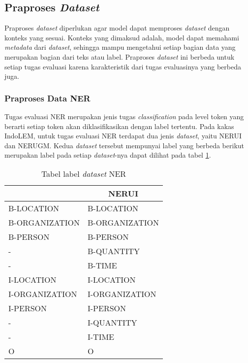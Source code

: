 \subsection{Praproses \textit{Dataset}}
\label{sec:praproses}

Praproses \textit{dataset} diperlukan agar model dapat memproses \textit{dataset} dengan konteks yang sesuai. Konteks yang dimaksud adalah, model dapat memahami \textit{metadata} dari \textit{dataset}, sehingga mampu mengetahui setiap bagian data yang merupakan bagian dari teks atau label. Praproses \textit{dataset} ini berbeda untuk setiap tugas evaluasi karena karakteristik dari tugas evaluasinya yang berbeda juga.

\subsubsection{Praproses Data NER}

Tugas evaluasi NER merupakan jenis tugas \textit{classification} pada level token yang berarti setiap token akan diklasifikasikan dengan label tertentu. Pada kakas IndoLEM, untuk tugas evaluasi NER terdapat dua jenis \textit{dataset}, yaitu NERUI dan NERUGM. Kedua \textit{dataset} tersebut mempunyai label yang berbeda berikut merupakan label pada setiap \textit{dataset}-nya dapat dilihat pada tabel \ref{table:label-ner}.

\begin{table}[h]
    \vspace{0.25cm}
    \caption{Tabel label \textit{dataset} NER}
    \label{table:label-ner}
    \begin{center}
        \begin{tabular}{|l|l|}
            \hline \rowcolor{black!10}
            \multicolumn{1}{|c|}{\textbf{NERUI}} & \multicolumn{1}{|c|}{\textbf{NERUI}} \\ \hline
            B-LOCATION & B-LOCATION \\ \hline
            B-ORGANIZATION & B-ORGANIZATION \\ \hline
            B-PERSON & B-PERSON \\ \hline
            - & B-QUANTITY \\ \hline
            - & B-TIME \\ \hline
            I-LOCATION & I-LOCATION \\ \hline
            I-ORGANIZATION & I-ORGANIZATION \\ \hline
            I-PERSON & I-PERSON \\ \hline
            - & I-QUANTITY \\ \hline
            - & I-TIME \\ \hline
            O & O \\ \hline
        \end{tabular}
    \end{center}
\end{table}

